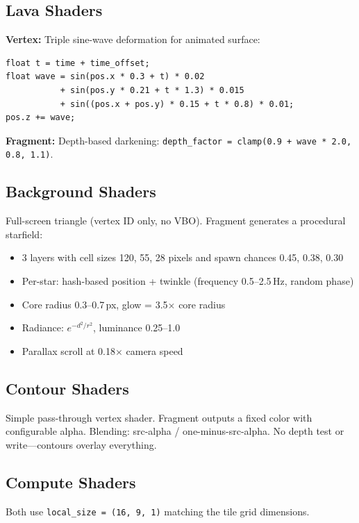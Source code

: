 \documentclass[11pt,a4paper]{article}
\begin{document}
\subsection{Lava Shaders}

\textbf{Vertex:} Triple sine-wave deformation for animated surface:
\begin{lstlisting}[style=glslstyle,numbers=none]
float t = time + time_offset;
float wave = sin(pos.x * 0.3 + t) * 0.02
           + sin(pos.y * 0.21 + t * 1.3) * 0.015
           + sin((pos.x + pos.y) * 0.15 + t * 0.8) * 0.01;
pos.z += wave;
\end{lstlisting}

\textbf{Fragment:} Depth-based darkening: \texttt{depth\_factor = clamp(0.9 + wave * 2.0, 0.8, 1.1)}.

\subsection{Background Shaders}

Full-screen triangle (vertex ID only, no VBO). Fragment generates a procedural starfield:
\begin{itemize}
  \item 3 layers with cell sizes 120, 55, 28 pixels and spawn chances 0.45, 0.38, 0.30
  \item Per-star: hash-based position + twinkle (frequency 0.5--2.5\,Hz, random phase)
  \item Core radius 0.3--0.7\,px, glow = 3.5$\times$ core radius
  \item Radiance: $e^{-d^2/r^2}$, luminance 0.25--1.0
  \item Parallax scroll at 0.18$\times$ camera speed
\end{itemize}

\subsection{Contour Shaders}

Simple pass-through vertex shader. Fragment outputs a fixed color with configurable alpha. Blending: src-alpha / one-minus-src-alpha. No depth test or write---contours overlay everything.

\subsection{Compute Shaders}

Both use \texttt{local\_size = (16, 9, 1)} matching the tile grid dimensions.
\end{document}

